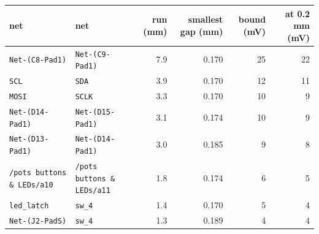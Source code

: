 \begin{tabular}{llrrrr}
\toprule
net & net & run (mm) & smallest gap (mm) & bound (mV) & at 0.2 mm (mV) \\
\midrule
\texttt{Net-(C8-Pad1)} & \texttt{Net-(C9-Pad1)} & 7.9 & 0.170 & 25 & 22 \\
\texttt{SCL} & \texttt{SDA} & 3.9 & 0.170 & 12 & 11 \\
\texttt{MOSI} & \texttt{SCLK} & 3.3 & 0.170 & 10 & 9 \\
\texttt{Net-(D14-Pad1)} & \texttt{Net-(D15-Pad1)} & 3.1 & 0.174 & 10 & 9 \\
\texttt{Net-(D13-Pad1)} & \texttt{Net-(D14-Pad1)} & 3.0 & 0.185 & 9 & 8 \\
\texttt{/pots buttons \& LEDs/a10} & \texttt{/pots buttons \& LEDs/a11} & 1.8 & 0.174 & 6 & 5 \\
\texttt{led\_latch} & \texttt{sw\_4} & 1.4 & 0.170 & 5 & 4 \\
\texttt{Net-(J2-PadS)} & \texttt{sw\_4} & 1.3 & 0.189 & 4 & 4 \\
\bottomrule
\end{tabular}
